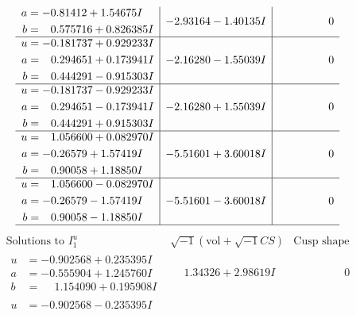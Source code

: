 \documentclass[1p]{elsarticle_modified}
\theoremstyle{definition}
\newcommand{\I}{\sqrt{-1}}
\begin{document}
$$\begin{array}{c|c|c}
\begin{aligned}
a &= -0.81412 + 1.54675 I \\
b &= \phantom{-}0.575716 + 0.826385 I\end{aligned}
 & -2.93164 - 1.40135 I & \phantom{-0.000000 } 0 \\ \hline\begin{aligned}
u &= -0.181737 + 0.929233 I \\
a &= \phantom{-}0.294651 + 0.173941 I \\
b &= \phantom{-}0.444291 - 0.915303 I\end{aligned}
 & -2.16280 - 1.55039 I & \phantom{-0.000000 } 0 \\ \hline\begin{aligned}
u &= -0.181737 - 0.929233 I \\
a &= \phantom{-}0.294651 - 0.173941 I \\
b &= \phantom{-}0.444291 + 0.915303 I\end{aligned}
 & -2.16280 + 1.55039 I & \phantom{-0.000000 } 0 \\ \hline\begin{aligned}
u &= \phantom{-}1.056600 + 0.082970 I \\
a &= -0.26579 + 1.57419 I \\
b &= \phantom{-}0.90058 + 1.18850 I\end{aligned}
 & -5.51601 + 3.60018 I & \phantom{-0.000000 } 0 \\ \hline\begin{aligned}
u &= \phantom{-}1.056600 - 0.082970 I \\
a &= -0.26579 - 1.57419 I \\
b &= \phantom{-}0.90058 - 1.18850 I\end{aligned}
 & -5.51601 - 3.60018 I & \phantom{-0.000000 } 0\\
 \hline 
 \end{array}$$\newpage$$\begin{array}{c|c|c}  
\text{Solutions to }I^u_{1}& \I (\text{vol} + \sqrt{-1}CS) & \text{Cusp shape}\\
 \hline 
\begin{aligned}
u &= -0.902568 + 0.235395 I \\
a &= -0.555904 + 1.245760 I \\
b &= \phantom{-}1.154090 + 0.195908 I\end{aligned}
 & \phantom{-}1.34326 + 2.98619 I & \phantom{-0.000000 } 0 \\ \hline\begin{aligned}
u &= -0.902568 - 0.235395 I \\

\end{aligned}
\end{array}$$
\end{document}
